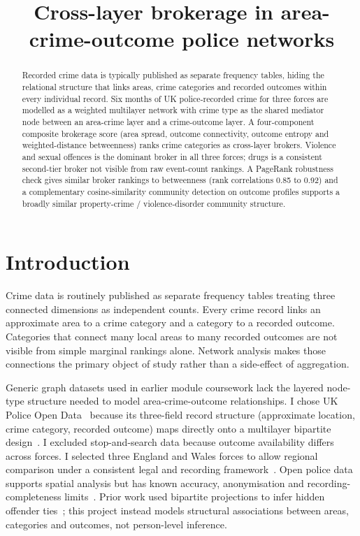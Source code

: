 \documentclass[conference,a4paper]{IEEEtran}
\title{Cross-layer brokerage in area-crime-outcome police networks}
\author{\IEEEauthorblockN{ECMM447 CW2, UoE,
760012524}}
\begin{document}
\maketitle

\begin{abstract}
Recorded crime data is typically published as separate frequency tables,
hiding the relational structure that links areas, crime categories and
recorded outcomes within every individual record.
Six months of UK police-recorded crime for three forces are modelled as
a weighted multilayer network with crime type as the shared mediator
node between an area-crime layer and a crime-outcome layer.
A four-component composite brokerage score (area spread, outcome
connectivity, outcome entropy and weighted-distance betweenness)
ranks crime categories as cross-layer brokers.
Violence and sexual offences is the dominant broker in all three
forces; drugs is a consistent second-tier broker not visible from raw
event-count rankings.
A PageRank robustness check gives similar broker rankings to
betweenness (rank correlations 0.85 to 0.92) and a complementary
cosine-similarity community detection on outcome profiles supports a
broadly similar property-crime / violence-disorder community structure.
\end{abstract}

\section{Introduction}

Crime data is routinely published as separate frequency tables treating
three connected dimensions as independent counts.
Every crime record links an approximate area to a crime category and a category to a recorded outcome. Categories that connect many local areas to many recorded outcomes are not visible from simple marginal rankings alone.
Network analysis makes those connections the primary object of study
rather than a side-effect of aggregation.

Generic graph datasets used in earlier module coursework lack
the layered node-type structure needed to model
area-crime-outcome relationships.
I chose UK Police Open Data~\cite{ukpoliceopendata} because its
three-field record structure (approximate location, crime category,
recorded outcome) maps directly onto a multilayer bipartite
design~\cite{kivela2014multilayer}.
I excluded stop-and-search data because outcome availability differs
across forces.
I selected three England and Wales forces to allow regional
comparison under a consistent legal and recording
framework~\cite{tompson2015policeuk}.
Open police data supports spatial analysis but has known
accuracy, anonymisation and recording-completeness
limits~\cite{tompson2015policeuk}.
Prior work used bipartite projections to infer hidden offender
ties~\cite{isah2015bipartite}; this project instead models structural
associations between areas, categories and outcomes, not
person-level inference.
\end{document}
